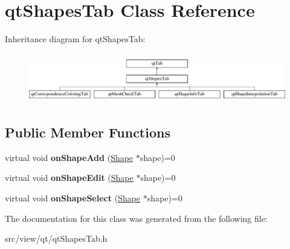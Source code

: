 \hypertarget{classqt_shapes_tab}{}\section{qt\+Shapes\+Tab Class Reference}
\label{classqt_shapes_tab}
Inheritance diagram for qt\+Shapes\+Tab\+:\begin{figure}[H]
\begin{center}
\leavevmode
\includegraphics[height=2.176166cm]{classqt_shapes_tab}
\end{center}
\end{figure}
\subsection*{Public Member Functions}
\begin{DoxyCompactItemize}
\item 
\hypertarget{classqt_shapes_tab_ac1785d1af606cd4ae0cd29708af7ae6f}{}virtual void {\bfseries on\+Shape\+Add} (\hyperlink{class_shape}{Shape} $\ast$shape)=0\label{classqt_shapes_tab_ac1785d1af606cd4ae0cd29708af7ae6f}

\item 
\hypertarget{classqt_shapes_tab_a7e6ef278c299ef8934b6c1164b90574a}{}virtual void {\bfseries on\+Shape\+Edit} (\hyperlink{class_shape}{Shape} $\ast$shape)=0\label{classqt_shapes_tab_a7e6ef278c299ef8934b6c1164b90574a}

\item 
\hypertarget{classqt_shapes_tab_a50992777c7c5bcdf31adbb23e6bfb3a5}{}virtual void {\bfseries on\+Shape\+Select} (\hyperlink{class_shape}{Shape} $\ast$shape)=0\label{classqt_shapes_tab_a50992777c7c5bcdf31adbb23e6bfb3a5}

\end{DoxyCompactItemize}


The documentation for this class was generated from the following file\+:\begin{DoxyCompactItemize}
\item 
src/view/qt/qt\+Shapes\+Tab.\+h\end{DoxyCompactItemize}
